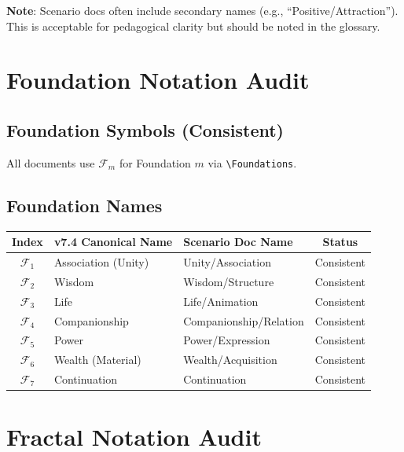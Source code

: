\documentclass[11pt]{article}
\begin{document}
\textbf{Note}: Scenario docs often include secondary names (e.g., ``Positive/Attraction''). This is acceptable for pedagogical clarity but should be noted in the glossary.

\section{Foundation Notation Audit}

\subsection{Foundation Symbols (Consistent)}
All documents use $\mathcal{F}_m$ for Foundation $m$ via \verb|\Foundations|.

\subsection{Foundation Names}
\begin{center}
\begin{tabular}{c|l|l|c}
\toprule
\textbf{Index} & \textbf{v7.4 Canonical Name} & \textbf{Scenario Doc Name} & \textbf{Status} \\
\midrule
$\mathcal{F}_1$ & Association (Unity) & Unity/Association & Consistent \\
$\mathcal{F}_2$ & Wisdom & Wisdom/Structure & Consistent \\
$\mathcal{F}_3$ & Life & Life/Animation & Consistent \\
$\mathcal{F}_4$ & Companionship & Companionship/Relation & Consistent \\
$\mathcal{F}_5$ & Power & Power/Expression & Consistent \\
$\mathcal{F}_6$ & Wealth (Material) & Wealth/Acquisition & Consistent \\
$\mathcal{F}_7$ & Continuation & Continuation & Consistent \\
\bottomrule
\end{tabular}
\end{center}

\section{Fractal Notation Audit}
\end{document}
